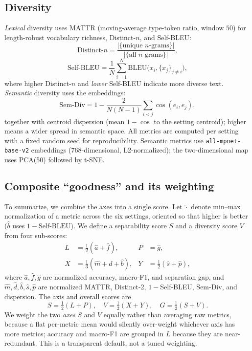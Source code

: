 \documentclass[conference]{IEEEtran}
\begin{document}
\subsection{Diversity}
\emph{Lexical} diversity uses MATTR (moving-average type-token ratio, window $50$) for length-robust vocabulary richness, Distinct-$n$, and Self-BLEU:
\begin{equation}
\text{Distinct-}n=\frac{|\{\text{unique }n\text{-grams}\}|}{|\{\text{all }n\text{-grams}\}|},
\end{equation}
\begin{equation}
\text{Self-BLEU}=\frac{1}{N}\sum_{i=1}^{N}\text{BLEU}\big(x_i,\{x_j\}_{j\neq i}\big),
\end{equation}
where higher Distinct-$n$ and \emph{lower} Self-BLEU indicate more diverse text. \emph{Semantic} diversity uses the embeddings:
\begin{equation}
\text{Sem-Div}=1-\frac{2}{N(N-1)}\sum_{i<j}\cos(e_i,e_j),
\end{equation}
together with centroid dispersion (mean $1-\cos$ to the setting centroid); higher means a wider spread in semantic space. All metrics are computed per setting with a fixed random seed for reproducibility. Semantic metrics use \texttt{all-mpnet-base-v2} embeddings ($768$-dimensional, L2-normalized); the two-dimensional map uses PCA(50) followed by t-SNE.

\subsection{Composite ``goodness'' and its weighting}
To summarize, we combine the axes into a single score. Let $\hat{\cdot}$ denote min--max normalization of a metric across the six settings, oriented so that higher is better ($\hat{b}$ uses $1-\text{Self-BLEU}$). We define a separability score $S$ and a diversity score $V$ from four sub-scores:
\begin{align}
L &= \tfrac{1}{2}(\hat{a}+\hat{f}), & P &= \hat{g}, \\
X &= \tfrac{1}{3}(\hat{m}+\hat{d}+\hat{b}), & Y &= \tfrac{1}{2}(\hat{s}+\hat{p}),
\end{align}
where $\hat{a},\hat{f},\hat{g}$ are normalized accuracy, macro-F1, and separation gap, and $\hat{m},\hat{d},\hat{b},\hat{s},\hat{p}$ are normalized MATTR, Distinct-2, $1-$Self-BLEU, Sem-Div, and dispersion. The axis and overall scores are
\begin{equation}
S=\tfrac{1}{2}(L+P),\quad V=\tfrac{1}{2}(X+Y),\quad G=\tfrac{1}{2}(S+V).
\end{equation}
We weight the two \emph{axes} $S$ and $V$ equally rather than averaging raw metrics, because a flat per-metric mean would silently over-weight whichever axis has more metrics; accuracy and macro-F1 are grouped in $L$ because they are near-redundant. This is a transparent default, not a tuned weighting.
\end{document}
